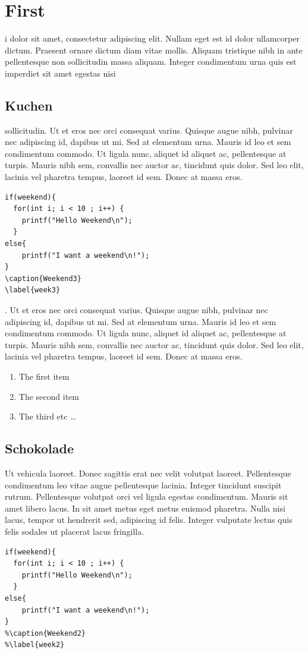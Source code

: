 
\chapter{First}
i \cite{knuth}dolor sit amet, consectetur adipiscing elit. Nullam eget est id dolor ullamcorper dictum. Praesent ornare dictum diam vitae mollis. Aliquam tristique nibh in ante pellentesque non sollicitudin massa aliquam. Integer condimentum urna quis est imperdiet sit amet egestas nisi 
\section{Kuchen}
sollicitudin. Ut et eros nec orci consequat varius. Quisque augue nibh, pulvinar nec adipiscing id, dapibus ut mi. Sed at elementum urna. Mauris id leo et sem condimentum commodo. Ut ligula nunc, aliquet id aliquet ac, pellentesque at turpis. Mauris nibh sem, convallis nec auctor ac, tincidunt quis dolor. Sed leo elit, lacinia vel pharetra tempus, laoreet id sem. Donec at massa eros.

\begin{lstlisting}[caption={Week},label=week1]
if(weekend){
  for(int i; i < 10 ; i++) {
    printf("Hello Weekend\n");
  }
else{
    printf("I want a weekend\n!");
}	
\caption{Weekend3}
\label{week3}
\end{lstlisting}

. Ut et eros nec orci consequat varius. Quisque augue nibh, pulvinar nec adipiscing id, dapibus ut mi. Sed at elementum urna. Mauris id leo et sem condimentum commodo. Ut ligula nunc, aliquet id aliquet ac, pellentesque at turpis. Mauris nibh sem, convallis nec auctor ac, tincidunt quis dolor. Sed leo elit, lacinia vel pharetra tempus, laoreet id sem. Donec at massa eros.

\begin{enumerate}
  \item The first item
  \item The second item
  \item The third etc \ldots
\end{enumerate}

\section{Schokolade}
Ut vehicula  laoreet. Donec sagittis erat nec velit volutpat laoreet. Pellentesque condimentum leo vitae augue pellentesque lacinia. Integer tincidunt suscipit rutrum. Pellentesque volutpat orci vel ligula egestas condimentum. Mauris sit amet libero lacus. In sit amet metus eget metus euismod pharetra. Nulla nisi lacus, tempor ut hendrerit sed, adipiscing id felis. Integer vulputate lectus quis felis sodales ut placerat lacus fringilla.
\begin{lstlisting}[caption={Useless code},label=useless]
if(weekend){
  for(int i; i < 10 ; i++) {
    printf("Hello Weekend\n");
  }
else{
    printf("I want a weekend\n!");
}	
%\caption{Weekend2}
%\label{week2}
\end{lstlisting}

